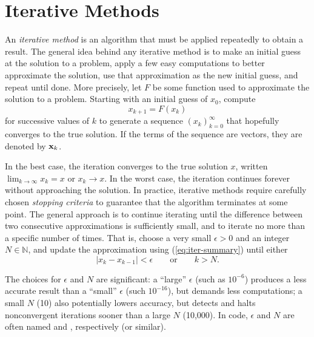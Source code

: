 \label{lab:NewtonsMethod}

\section*{Iterative Methods} %

An \emph{iterative method} is an algorithm that must be applied repeatedly to obtain a result.
The general idea behind any iterative method is to make an initial guess at the solution to a problem, apply a few easy computations to better approximate the solution, use that approximation as the new initial guess, and repeat until done.
More precisely, let $F$ be some function used to approximate the solution to a problem.
Starting with an initial guess of $x_0$, compute
\begin{equation}x_{k+1} = F(x_k)\label{eq:iter-summary}\end{equation}
for successive values of $k$ to generate a sequence $(x_k)_{k=0}^\infty$ that hopefully converges to the true solution.
If the terms of the sequence are vectors, they are denoted by $\mathbf{x}_k$.

In the best case, the iteration converges to the true solution $x$, written $\lim_{k\rightarrow\infty} x_k = x$ or $x_k\rightarrow x$.
In the worst case, the iteration continues forever without approaching the solution.
In practice, iterative methods require carefully chosen \emph{stopping criteria} to guarantee that the algorithm terminates at some point.
The general approach is to continue iterating until the difference between two consecutive approximations is sufficiently small, and to iterate no more than a specific number of times.
That is, choose a very small $\epsilon > 0$ and an integer $N\in\mathbb{N}$, and update the approximation using (\ref{eq:iter-summary}) until either
\begin{equation} %
|x_k - x_{k-1}| < \epsilon
\qquad \text{or} \qquad
k > N.
\label{stopping-criteria}
\end{equation}

The choices for $\epsilon$ and $N$ are significant: a ``large'' $\epsilon$ (such as $10^{-6}$) produces a less accurate result than a ``small'' $\epsilon$ (such $10^{-16}$), but demands less computations; a small $N$ (10) also potentially lowers accuracy, but detects and halts nonconvergent iterations sooner than a large $N$ (10,000).
In code, $\epsilon$ and $N$ are often named  and , respectively (or similar).

